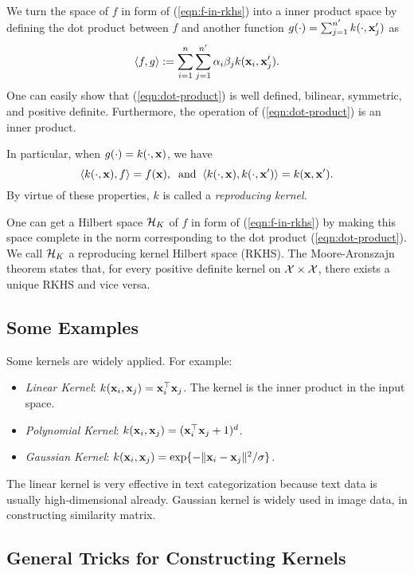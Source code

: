 We turn the space of $f$ in form of (\ref{eqn:f-in-rkhs}) into a inner product space by defining the dot product between $f$ and another function $g(\cdot)=\sum_{j=1}^{n'}k(\cdot,\mathbf{x}_j')$ as
\begin{equation}
\la f, g \ra :=\sum_{i=1}^n\sum_{j=1}^{n'}\a_i\beta_jk(\x_i,\x'_j).\label{eqn:dot-product}
\end{equation}
One can easily show that (\ref{eqn:dot-product}) is well defined, bilinear, symmetric, and positive definite. Furthermore, the operation of (\ref{eqn:dot-product}) is an inner product.

In particular, when $g(\cdot)=k(\cdot,\mathbf{x})$, we have
\begin{equation}
\la k(\cdot,\x),f \ra=f(\x), \;\;\mbox{and}\;\; \la k(\cdot,\x),k(\cdot,\x') \ra=k(\x,\x').\label{eqn:reproducing-prop}
\end{equation}
By virtue of these properties, $k$ is called a {\em reproducing kernel}.

One can get a Hilbert space ${\cal H}_K$ of $f$ in form of (\ref{eqn:f-in-rkhs}) by making this space complete in the norm corresponding to the dot product (\ref{eqn:dot-product}). We call ${\cal H}_K$ a reproducing kernel Hilbert space (RKHS). The Moore-Aronszajn theorem \cite{tams/Aronszajn1950} states that, for every positive definite kernel on ${\cal X}\times{\cal X}$, there exists a unique RKHS and vice versa.

\subsection{Some Examples}

Some kernels are widely applied. For example:
\begin{itemize}
  \item {\em Linear Kernel}: $k(\mathbf{x}_i,\mathbf{x}_j)=\mathbf{x}_i^\top\mathbf{x}_j$. The kernel is the inner product in the input space.
  \item {\em Polynomial Kernel}: $k(\mathbf{x}_i,\mathbf{x}_j)=(\mathbf{x}_i^\top\mathbf{x}_j+1)^d$.
  \item {\em Gaussian Kernel}: $k(\mathbf{x}_i,\mathbf{x}_j)=\exp\{-\|\mathbf{x}_i-\mathbf{x}_j\|^2/\sigma\}$.
\end{itemize}

The linear kernel is very effective in text categorization because text data is usually high-dimensional already. Gaussian kernel is widely used in image data, in constructing similarity matrix.

\subsection{General Tricks for Constructing Kernels}

